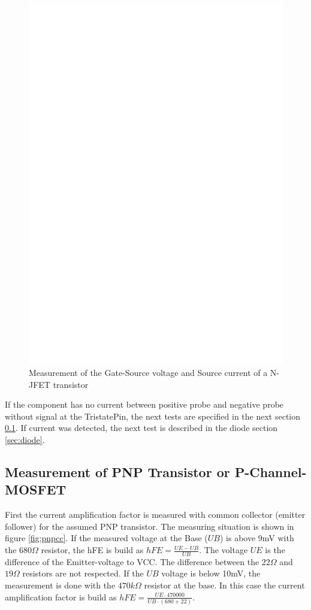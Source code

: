 \begin{figure}[H]
\centering
\includegraphics[]{../FIG/JFETcd.eps}
\caption{Measurement of the  Gate-Source voltage and Source current of a N-JFET transistor}
\label{fig:JFETcd}
\end{figure}

If the component has no current between positive probe and negative probe without signal at the
TristatePin, the next tests are specified in the next section \ref{sec:pnp}.
If current was detected, the next test is described in the diode section \ref{sec:diode}.

\subsection{Measurement of PNP Transistor or P-Channel-MOSFET}
\label{sec:pnp}
First the current amplification factor is measured with common collector (emitter follower) for the assumed
PNP transistor.
The measuring situation is shown in figure \ref{fig:pnpcc}.
If the measured voltage at the Base (\(UB\)) is above 9mV with the \(680\Omega\) resistor,
the hFE is build as \(hFE = \frac{UE-UB}{UB}\).
The voltage \(UE\) is the difference of the Emitter-voltage to VCC.
The difference between the \(22\Omega\) and \(19\Omega\) resistors are not respected.
If the \(UB\) voltage is below 10mV, the measurement is done with the \(470k\Omega\) resistor at the base.
In this case the current amplification factor is build as \(hFE = \frac{UE \cdot 470000}{UB \cdot (680+22)}\).


